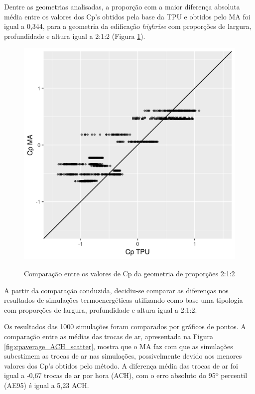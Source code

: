 \documentclass[brazil,hardcopy,openany,a4paper]{ufscthesis}
\begin{document}
		Dentre as geometrias analisadas, a proporção com a maior diferença absoluta média entre os valores dos	Cp’s obtidos pela base da TPU e obtidos pelo MA foi igual a 0,344, para a geometria da edificação \textit{highrise} com proporções de largura, profundidade e altura igual a 2:1:2 (Figura \ref{fig:cp_diff_scatter}).
	
		\begin{figure}[H]
			\centering
			\caption{Comparação entre os valores de Cp da geometria de proporções 2:1:2}
			\includegraphics[width=1\linewidth]{img/cp_diff_scatter.png}
			\label{fig:cp_diff_scatter}
		\end{figure}
	
		A partir da comparação conduzida, decidiu-se comparar as diferenças nos resultados de simulações termoenergéticas utilizando como base uma tipologia com proporções de largura, profundidade e altura igual a 2:1:2.
		
		Os resultados das 1000 simulações foram comparados por gráficos de pontos. A comparação entre as médias das trocas de ar, apresentada na Figura \ref{fig:cpaverage_ACH_scatter}, mostra que o MA faz com que as simulações subestimem as trocas de ar nas simulações, possivelmente devido aos menores valores dos Cp's obtidos pelo método.
		A diferença média das trocas de ar foi igual a -0,67 trocas de ar por hora (ACH), com o erro absoluto do 95º percentil (AE95) é igual a 5,23 ACH.
		
\end{document}
